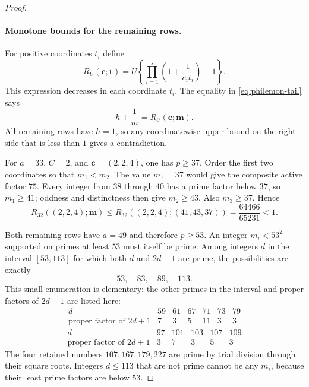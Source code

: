 \documentclass[11pt,a4paper]{article}
\theoremstyle{definition}\newtheorem{definition}[theorem]{Definition}
\theoremstyle{remark}\newtheorem{remark}[theorem]{Remark}
\begin{document}
\begin{proof}
\paragraph{Monotone bounds for the remaining rows.}
For positive coordinates $t_i$ define
\[
 R_U(\boldsymbol c;\boldsymbol t)
 =U\left\{\prod_{i=1}^s\left(1+\frac1{c_i t_i}\right)-1\right\}.
\]
This expression decreases in each coordinate $t_i$.
The equality in \eqref{eq:philemon-tail} says
\begin{equation}\label{eq:philemon-64-monotone}
 h+\frac1m=R_U(\boldsymbol c;\boldsymbol m).
\end{equation}
All remaining rows have $h=1$, so any coordinatewise upper bound on
the right side that is less than $1$ gives a contradiction.

For $a=33$, $C=2$, and $\boldsymbol c=(2,2,4)$, one has $p\geq37$.
Order the first two coordinates so that $m_1<m_2$.
The value $m_1=37$ would give the composite active factor $75$.
Every integer from $38$ through $40$ has a prime factor below $37$,
so $m_1\geq41$; oddness and distinctness then give $m_2\geq43$.
Also $m_3\geq37$.  Hence
\begin{equation}\label{eq:philemon-64-bound33}
 R_{32}((2,2,4);\boldsymbol m)
 \leq R_{32}((2,2,4);(41,43,37))
 =\frac{64466}{65231}<1.
\end{equation}

Both remaining rows have $a=49$ and therefore $p\geq53$.
An integer $m_i<53^2$ supported on primes at least $53$ must itself
be prime.  Among integers $d$ in the interval $[53,113]$ for which
both $d$ and $2d+1$ are prime, the possibilities are exactly
\begin{equation}\label{eq:philemon-64-small-values}
 53,\quad83,\quad89,\quad113.
\end{equation}
This small enumeration is elementary: the other primes in the interval
and proper factors of $2d+1$ are listed here:
\[
\begin{array}{c|rrrrrr}
 d&59&61&67&71&73&79\\
 \text{proper factor of }2d+1&7&3&5&11&3&3
\end{array}
\]
\[
\begin{array}{c|rrrrr}
 d&97&101&103&107&109\\
 \text{proper factor of }2d+1&3&7&3&5&3
\end{array}
\]
The four retained numbers $107,167,179,227$ are prime by trial division
through their square roots.  Integers $d\leq113$ that are not prime
cannot be any $m_i$, because their least prime factors are below $53$.


\end{proof}
\end{document}
